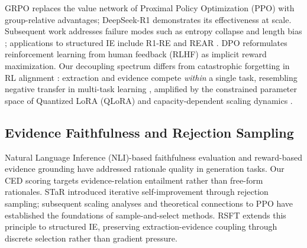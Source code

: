GRPO \citep{shao2024deepseekmath} replaces the value network of Proximal Policy Optimization (PPO) \citep{schulman2017ppo} with group-relative advantages; DeepSeek-R1 \citep{deepseek2025r1} demonstrates its effectiveness at scale. Subsequent work addresses failure modes such as entropy collapse \citep{yu2025dapo} and length bias \citep{liu2025drgrpo}; applications to structured IE include R1-RE \citep{dai2025r1re} and REAR \citep{wang2025rear}. DPO \citep{rafailov2023direct} reformulates reinforcement learning from human feedback (RLHF) \citep{ouyang2022instructgpt} as implicit reward maximization. Our decoupling spectrum differs from catastrophic forgetting in RL alignment \citep{jin2025rl_panacea}: extraction and evidence compete \emph{within} a single task, resembling negative transfer in multi-task learning \citep{ruder2017overview}, amplified by the constrained parameter space of Quantized LoRA (QLoRA) \citep{dettmers2023qlora} and capacity-dependent scaling dynamics \citep{gao2023scaling}.

\subsection{Evidence Faithfulness and Rejection Sampling}
\label{sec:rw_faithfulness}

Natural Language Inference (NLI)-based faithfulness evaluation \citep{laban2022summac,zhang2024infuse} and reward-based evidence grounding \citep{li2025srvf,tamo2026evidencerl} have addressed rationale quality in generation tasks. Our CED scoring targets evidence-relation entailment rather than free-form rationales. STaR \citep{zelikman2022star} introduced iterative self-improvement through rejection sampling; subsequent scaling analyses \citep{gulcehre2023rest,yuan2023rft} and theoretical connections to PPO \citep{tang2025rsftppo} have established the foundations of sample-and-select methods. RSFT extends this principle to structured IE, preserving extraction-evidence coupling through discrete selection rather than gradient pressure.
